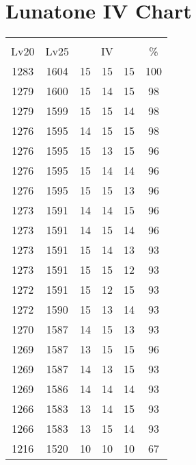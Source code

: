 \documentclass{article}%
\begin{document}
%
\normalsize%
\section{Lunatone IV Chart}%
\label{sec:Lunatone IV Chart}%
\renewcommand{\arraystretch}{1.5}%
\begin{tabular}{|c|c|c|c|c|c|}%
\hline%
\multicolumn{6}{|c|}{\textcolor{white}{ 
\linebreak{Lunatone}
}%
\cellcolor{black}}\\%
\multicolumn{1}{|c}{Lv20}&\multicolumn{1}{c|}{Lv25}&\multicolumn{3}{c|}{IV}&\multicolumn{1}{|c|}{\%}\\%
\hline%
\rowcolor{color100}%
1283&1604&15&15&15&100\\%
\hline%
\rowcolor{color98}%
1279&1600&15&14&15&98\\%
\hline%
\rowcolor{color98}%
1279&1599&15&15&14&98\\%
\hline%
\rowcolor{color98}%
1276&1595&14&15&15&98\\%
\hline%
\rowcolor{color96}%
1276&1595&15&13&15&96\\%
\hline%
\rowcolor{color96}%
1276&1595&15&14&14&96\\%
\hline%
\rowcolor{color96}%
1276&1595&15&15&13&96\\%
\hline%
\rowcolor{color96}%
1273&1591&14&14&15&96\\%
\hline%
\rowcolor{color96}%
1273&1591&14&15&14&96\\%
\hline%
\rowcolor{color93}%
1273&1591&15&14&13&93\\%
\hline%
\rowcolor{color93}%
1273&1591&15&15&12&93\\%
\hline%
\rowcolor{color93}%
1272&1591&15&12&15&93\\%
\hline%
\rowcolor{color93}%
1272&1590&15&13&14&93\\%
\hline%
\rowcolor{color93}%
1270&1587&14&15&13&93\\%
\hline%
\rowcolor{color96}%
1269&1587&13&15&15&96\\%
\hline%
\rowcolor{color93}%
1269&1587&14&13&15&93\\%
\hline%
\rowcolor{color93}%
1269&1586&14&14&14&93\\%
\hline%
\rowcolor{color93}%
1266&1583&13&14&15&93\\%
\hline%
\rowcolor{color93}%
1266&1583&13&15&14&93\\%
\hline%
\rowcolor{color91}%
1216&1520&10&10&10&67\\%
\end{tabular}

%
\end{document}
